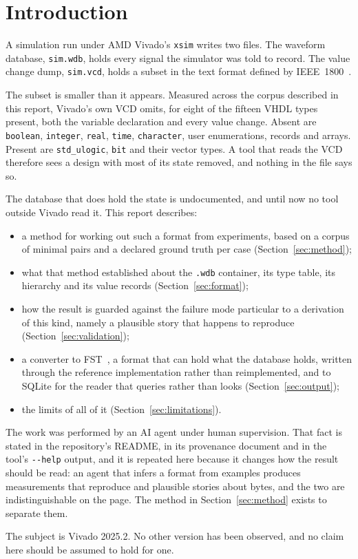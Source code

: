 \section{Introduction}

A simulation run under AMD Vivado's \texttt{xsim} writes two files. The
waveform database, \texttt{sim.wdb}, holds every signal the simulator
was told to record. The value change dump, \texttt{sim.vcd}, holds a
subset in the text format defined by IEEE~1800~\cite{ieee1800}.

The subset is smaller than it appears. Measured across the corpus
described in this report, Vivado's own VCD omits, for eight of the
fifteen VHDL types present, both the variable declaration and every
value change. Absent are \texttt{boolean}, \texttt{integer},
\texttt{real}, \texttt{time}, \texttt{character}, user enumerations,
records and arrays. Present are \texttt{std\_ulogic}, \texttt{bit} and
their vector types. A tool that reads the VCD therefore sees a design
with most of its state removed, and nothing in the file says so.

The database that does hold the state is undocumented, and until now
no tool outside Vivado read it. This report describes:

\begin{itemize}
  \item a method for working out such a format from experiments, based
        on a corpus of minimal pairs and a declared ground truth per
        case (Section~\ref{sec:method});
  \item what that method established about the \texttt{.wdb}
        container, its type table, its hierarchy and its value records
        (Section~\ref{sec:format});
  \item how the result is guarded against the failure mode particular
        to a derivation of this kind, namely a plausible story that
        happens to reproduce (Section~\ref{sec:validation});
  \item a converter to FST~\cite{fst}, a format that can hold what the
        database holds, written through the reference implementation
        rather than reimplemented, and to SQLite for the reader that
        queries rather than looks (Section~\ref{sec:output});
  \item the limits of all of it (Section~\ref{sec:limitations}).
\end{itemize}

The work was performed by an AI agent under human supervision. That
fact is stated in the repository's README, in its provenance document
and in the tool's \texttt{-{}-help} output, and it is repeated here
because it changes how the result should be read: an agent that infers
a format from examples produces measurements that reproduce and
plausible stories about bytes, and the two are indistinguishable on
the page. The method in Section~\ref{sec:method} exists to separate
them.

The subject is Vivado 2025.2. No other version has been observed, and
no claim here should be assumed to hold for one.
